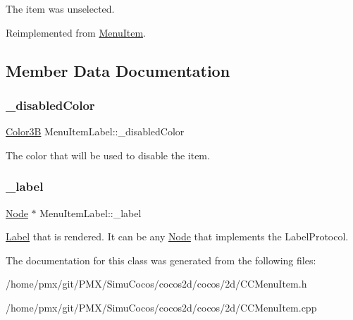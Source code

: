 The item was unselected. 

Reimplemented from \hyperlink{classMenuItem_a3abeecc6d59ada50f4123e3e36ae4892}{Menu\+Item}.



\subsection{Member Data Documentation}
\mbox{\label{classMenuItemLabel_ac7d3fb33f25925a207e2acc15b3b7edd}} 
\subsubsection{\texorpdfstring{\+\_\+disabled\+Color}{\_disabledColor}}
{\footnotesize\ttfamily \hyperlink{structColor3B}{Color3B} Menu\+Item\+Label\+::\+\_\+disabled\+Color\hspace{0.3cm}{\ttfamily [protected]}}

The color that will be used to disable the item. \mbox{\label{classMenuItemLabel_a63107854e5ce5d5f177636d905ff46fa}} 
\subsubsection{\texorpdfstring{\+\_\+label}{\_label}}
{\footnotesize\ttfamily \hyperlink{classNode}{Node} $\ast$ Menu\+Item\+Label\+::\+\_\+label\hspace{0.3cm}{\ttfamily [protected]}}

\hyperlink{classLabel}{Label} that is rendered. It can be any \hyperlink{classNode}{Node} that implements the Label\+Protocol. 

The documentation for this class was generated from the following files\+:\begin{DoxyCompactItemize}
\item 
/home/pmx/git/\+P\+M\+X/\+Simu\+Cocos/cocos2d/cocos/2d/C\+C\+Menu\+Item.\+h\item 
/home/pmx/git/\+P\+M\+X/\+Simu\+Cocos/cocos2d/cocos/2d/C\+C\+Menu\+Item.\+cpp\end{DoxyCompactItemize}
